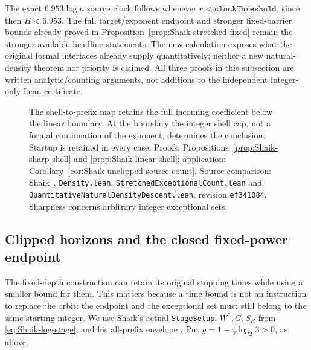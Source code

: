 The exact \(6.953\log n\) source clock follows whenever
\(r<\texttt{clockThreshold}\), since then \(H<6.953\).
The full target/exponent endpoint and stronger fixed-barrier bounds
already proved in Proposition~\ref{prop:Shaik-stretched-fixed} remain
the stronger available headline statements.
The new calculation exposes what the original formal interfaces
already supply quantitatively; neither a new natural-density theorem
nor priority is claimed. All three proofs in this subsection are
written analytic/counting arguments, not additions to the independent
integer-only Lean certificate.

\begin{figure}[ht]
\centering
{}
\caption{The shell-to-prefix map retains the full incoming coefficient
below the linear boundary. At the boundary the integer shell cap, not a
formal continuation of the exponent, determines the conclusion.
Startup is retained in every case. Proofs:
Propositions~\ref{prop:Shaik-sharp-shell} and
\ref{prop:Shaik-linear-shell}; application:
Corollary~\ref{cor:Shaik-unclipped-source-count}.
Source comparison: Shaik~\cite{Shaik2026v324},
\texttt{Density.lean}, \texttt{StretchedExceptionalCount.lean} and
\texttt{QuantitativeNaturalDensityDescent.lean}, revision
\texttt{ef341084}. Sharpness concerns arbitrary integer exceptional sets.}
\end{figure}

\subsection{Clipped horizons and the closed fixed-power endpoint}

The fixed-depth construction can retain its original stopping times while
using a smaller bound for them. This matters because a time bound is not
an instruction to replace the orbit: the endpoint and the exceptional set
must still belong to the same starting integer. We use Shaik's actual
\texttt{StageSetup}, \(W^*,G,S_R\) from
\eqref{eq:Shaik-log-stage}, and his all-prefix envelope
\cite{Shaik2026v324}. Put \(g=1-\frac12\log_2 3>0\), as above.

